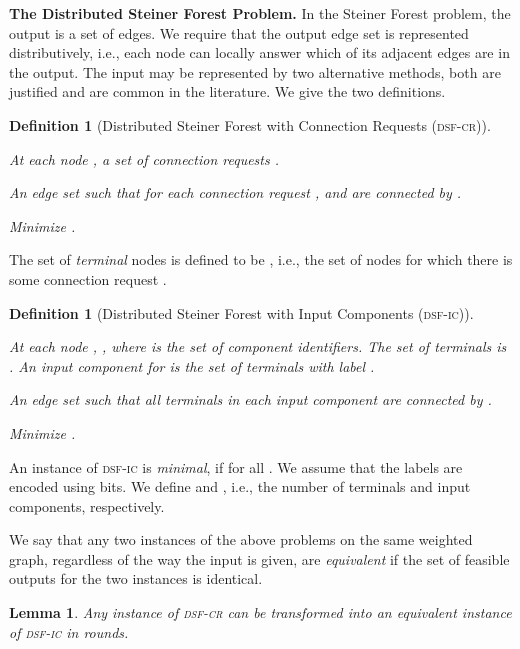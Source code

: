 \documentclass[letterpaper,11pt]{article}
\newtheorem{lemma}[theorem]{Lemma}
\newtheorem{definition}[theorem]{Definition}
\newcommand{\sfcr}{\textsc{dsf-cr}\xspace}
\newcommand{\sfic}{\textsc{dsf-ic}\xspace}
\renewcommand{\paragraph}[1]{\smallskip\par\noindent\textbf{#1}}
\begin{document}
\paragraph{The Distributed Steiner Forest Problem.}
In the Steiner Forest problem, the output is a set of edges. We
require that the output edge set  is represented distributively,
i.e., each node 
can locally answer which of its adjacent 
edges are in the output.
The input may be represented by two alternative methods, both are
justified and are common in the
literature. We give the two definitions.
\begin{definition}
[Distributed Steiner Forest with Connection Requests (\sfcr)]\ 
\begin{compactitem}
\item[\textbf{Input:}] At each node , a set of \emph{connection
    requests} .
\item[\textbf{Output:}] An edge set  such that
  for each connection request ,  and  are connected by
.
\item[\textbf{Goal:}] Minimize .
\end{compactitem}
\end{definition}
\noindent


The set of \emph{terminal} nodes is defined to be , i.e., the
set of nodes  for which there is some connection request .

\begin{definition}[Distributed Steiner Forest with Input Components (\sfic)]\ 
\begin{compactitem}
\item[\textbf{Input:}] At each node , , where  is the set of \emph{component
    identifiers}. The set of \emph{terminals} is . An \emph{input component}  for
 is the set of terminals with label .
\item[\textbf{Output:}] An edge set  such that all terminals
  in each
  {input component}  are connected by .
\item[\textbf{Goal:}] Minimize .
\end{compactitem}
\end{definition}
An instance of \sfic is \emph{minimal}, if  for all
. We assume that the labels  are encoded
using  bits. We define  and , i.e., the number of terminals and input components, respectively. 

We say that any two instances of the above problems on the same
weighted graph, regardless of the way the input is given, are
\emph{equivalent} if the set of feasible outputs for the two instances
is identical.
\begin{lemma}\label{lemma:transform_to_input}
Any instance of \sfcr can be transformed into an
  equivalent instance of \sfic in  rounds.
\end{lemma}
\end{document}
